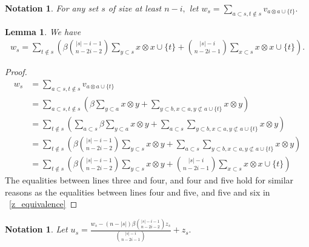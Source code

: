 \documentclass{amsart}
\newtheorem{lem}[subsubsection]{Lemma}
\newtheorem{note}[subsubsection]{Notation}
\begin{document}
\begin{note}
For any set $s$ of size at least $n-i,$ let $w_s = \sum_{a \subset s,t\notin s}^{}v_{a \otimes a \cup \{t\}}.$
\end{note}

\begin{lem}
\label{w_equivalence}
We have 
\begin{align*}
	w_s = \sum_{t\notin s}^{} \left(\beta \binom {|s|-i-1}{n-2i-2}	\sum_{y \subset s}^{}x\otimes x \cup \{t\}  + \binom {|s|-i}{n-2i-1} \sum_{x \subset s}^{}x \otimes x \cup \{t\} \right).
\end{align*}
\end{lem}

\begin{proof}
\begin{align*}
	w_s &= \sum_{a \subset s,t\notin s}^{}v_{a \otimes a \cup \{t\}}\\
	&= \sum_{a \subset s,t\notin s}^{}\left(\beta \sum_{y \subset a}^{}x \otimes y + \sum_{y\subset b,x \subset a,y\not\subset a \cup \{t\}}^{}x\otimes y \right)\\
	&= \sum_{t\notin s}^{}\left(\sum_{a \subset s}^{}\beta \sum_{y \subset a}^{}x \otimes y + \sum_{a \subset s}^{}\sum_{y\subset b,x \subset a,y\not\subset a \cup \{t\}}^{}x\otimes y \right)\\
	&=\sum_{t\notin s}^{}\left(\beta \binom {|s|-i-1}{n-2i-2}\sum_{y \subset s}^{}x\otimes y + \sum_{a \subset s}^{}\sum_{y\subset b,x \subset a,y\not\subset a \cup \{t\}}^{}x\otimes y \right)\\
	&=\sum_{t\notin s}^{} \left(\beta \binom {|s|-i-1}{n-2i-2}\sum_{y \subset s}^{}x\otimes y + \binom {|s|-i}{n-2i-1}\sum_{x \subset s}^{}x \otimes x \cup \{t\} \right)
\end{align*}
The equalities between lines three and four, and four and five hold for similar reasons as the equalities between lines four and five, and five and six in ~\ref{z_equivalence}
\end{proof}

\begin{note}
Let $u_s = \frac{w_s - (n - |s|)\beta \binom {|s|-i-1}{n-2i-2} z_s}{\binom {|s|-i}{n-2i-1}} + z_s.$
\end{note}
\end{document}
